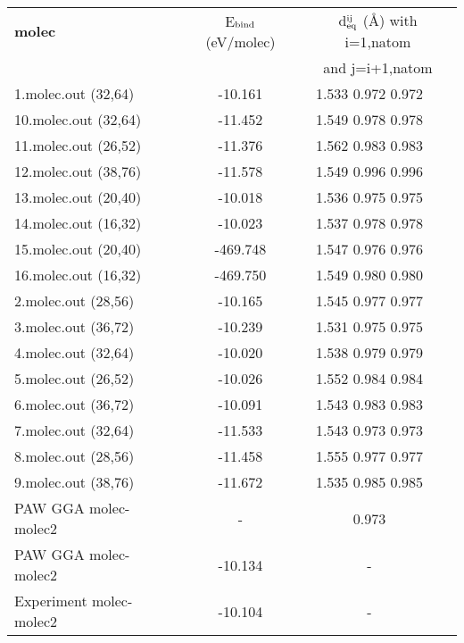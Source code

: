 \documentclass[onecolumn]{revtex4}
\begin{document}
\begin{center}
\begin{tabular}{lccccc}
\hline
\hline
\bf{molec}&\multicolumn{2}{c}{E$_{\rm bind}$ (eV/molec)}&\multicolumn{3}{c}{d$_{\rm eq}^{\rm ij}$ (\AA) with i=1,natom} \\
&\multicolumn{2}{c}{}&\multicolumn{3}{c}{and j=i+1,natom} \\
\hline
1.molec.out (32,64)&\multicolumn{2}{c}{-10.161}&\multicolumn{2}{c}{1.533 0.972 0.972 } \\ 
10.molec.out (32,64)&\multicolumn{2}{c}{-11.452}&\multicolumn{2}{c}{1.549 0.978 0.978 } \\ 
11.molec.out (26,52)&\multicolumn{2}{c}{-11.376}&\multicolumn{2}{c}{1.562 0.983 0.983 } \\ 
12.molec.out (38,76)&\multicolumn{2}{c}{-11.578}&\multicolumn{2}{c}{1.549 0.996 0.996 } \\ 
13.molec.out (20,40)&\multicolumn{2}{c}{-10.018}&\multicolumn{2}{c}{1.536 0.975 0.975 } \\ 
14.molec.out (16,32)&\multicolumn{2}{c}{-10.023}&\multicolumn{2}{c}{1.537 0.978 0.978 } \\ 
15.molec.out (20,40)&\multicolumn{2}{c}{-469.748}&\multicolumn{2}{c}{1.547 0.976 0.976 } \\ 
16.molec.out (16,32)&\multicolumn{2}{c}{-469.750}&\multicolumn{2}{c}{1.549 0.980 0.980 } \\ 
2.molec.out (28,56)&\multicolumn{2}{c}{-10.165}&\multicolumn{2}{c}{1.545 0.977 0.977 } \\ 
3.molec.out (36,72)&\multicolumn{2}{c}{-10.239}&\multicolumn{2}{c}{1.531 0.975 0.975 } \\ 
4.molec.out (32,64)&\multicolumn{2}{c}{-10.020}&\multicolumn{2}{c}{1.538 0.979 0.979 } \\ 
5.molec.out (26,52)&\multicolumn{2}{c}{-10.026}&\multicolumn{2}{c}{1.552 0.984 0.984 } \\ 
6.molec.out (36,72)&\multicolumn{2}{c}{-10.091}&\multicolumn{2}{c}{1.543 0.983 0.983 } \\ 
7.molec.out (32,64)&\multicolumn{2}{c}{-11.533}&\multicolumn{2}{c}{1.543 0.973 0.973 } \\ 
8.molec.out (28,56)&\multicolumn{2}{c}{-11.458}&\multicolumn{2}{c}{1.555 0.977 0.977 } \\ 
9.molec.out (38,76)&\multicolumn{2}{c}{-11.672}&\multicolumn{2}{c}{1.535 0.985 0.985 } \\ 
PAW GGA molec-molec2~\cite{Yang_PRB71_2005} & \multicolumn{2}{c}{-} & \multicolumn{2}{c}{0.973} \\ %
PAW GGA molec-molec2~\cite{Paier_JCP122_2005} & \multicolumn{2}{c}{-10.134} & \multicolumn{2}{c}{-} \\ %
Experiment molec-molec2~\cite{Paier_JCP122_2005} & \multicolumn{2}{c}{-10.104} & \multicolumn{2}{c}{-} \\ %
\hline
\hline
\end{tabular}
\end{center}
\end{document}
